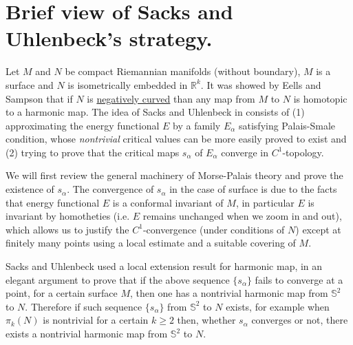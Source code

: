 \iffalse
\begin{info}
The PDF version of this page can be downloaded by replacing \texttt{html} in the its address by
\texttt{pdf}. 
For example \texttt{/html/sheaf-cohomology.html} should become \texttt{/pdf/sheaf-cohomology.pdf}.
\end{info}
\fi

\iffalse
This post is my reading note for \cite{sacks_existence_1981}. I want to present the authors'
ideas as clear as possible and I may probably skip a few (important) details and computations.
\fi

\section{Brief view of Sacks and Uhlenbeck's strategy.}
\label{sec:org932e912}

Let \(M\) and \(N\) be compact Riemannian manifolds (without boundary), \(M\) is a
surface and \(N\) is isometrically embedded in \(\mathbb{R}^k\). It was showed by
Eells and Sampson \cite{eells_harmonic_1964} that if \(N\) is \href{harmonic-map-existence.org}{negatively curved} than any
map from \(M\) to \(N\) is homotopic to a harmonic map. The idea of Sacks and
Uhlenbeck in \cite{sacks_existence_1981} consists of (1) approximating the energy functional
\(E\) by a family \(E_\alpha\) satisfying Palais-Smale condition, whose
\emph{nontrivial} critical values can be more easily proved to exist and (2) trying to prove
that the critical maps \(s_\alpha\) of \(E_\alpha\) converge in \(C^1\)-topology.

We will first review the general machinery of Morse-Palais theory and prove the existence
of \(s_\alpha\). The convergence of \(s_\alpha\) in the case of surface is due to the
facts that energy functional \(E\) is a conformal invariant of \(M\), in particular \(E\) is
invariant by homotheties (i.e.  \(E\) remains unchanged when we zoom in and out), which
allows us to justify the \(C^1\)-convergence (under conditions of \(N\)) except at
finitely many points using a local estimate and a suitable
covering of \(M\). 

Sacks and Uhlenbeck used a local extension result for harmonic map, in an elegant argument
to prove that if the above sequence \(\{s_\alpha\}\) fails to converge at a point,
for a certain surface \(M\), then one has a nontrivial harmonic map from \(\mathbb{S}^2\) to \(N\). Therefore if such sequence \(\{ s_\alpha \}\) from \(\mathbb{S}^2\) to \(N\) exists, for example when \(\pi_k (N)\) is nontrivial for a certain \(k\geq 2\) then, 
whether \(s_\alpha\) converges or not, there exists a nontrivial harmonic map from \(\mathbb{S}^2\) to \(N\). 

